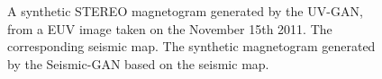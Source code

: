 \documentclass[11pt,a4paper,onecolumn]{report}
\begin{document}
\begin{figure}[t]%
  \centering
  \caption[]{ A synthetic STEREO magnetogram
  generated by the UV-GAN, from a EUV image taken on the November 15th 2011.
   The corresponding seismic map.
   The synthetic magnetogram generated by the
  Seismic-GAN based on the seismic map.}
  \label{fig:seismic_2011_11_15}
\end{figure}
\end{document}
